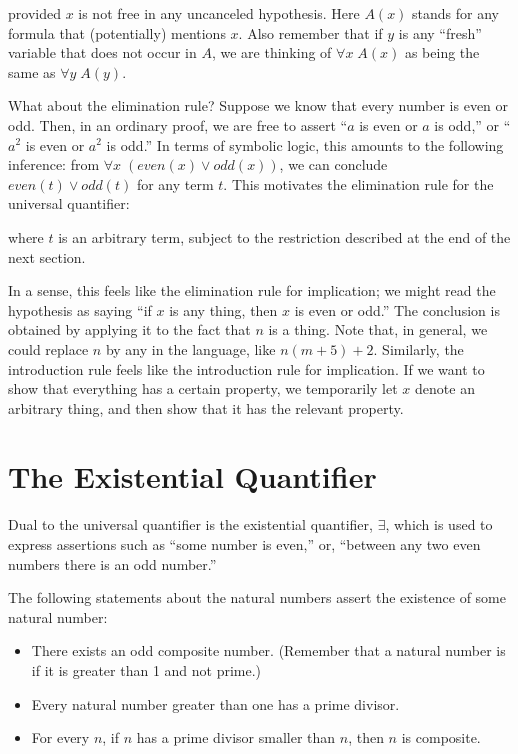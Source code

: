 \documentclass[letterpaper,10pt,english]{sphinxmanual}
\begin{document}
\sphinxAtStartPar
provided \(x\) is not free in any uncanceled hypothesis. Here \(A(x)\) stands for any formula that (potentially) mentions \(x\). Also remember that if \(y\) is any “fresh” variable that does not occur in \(A\), we are thinking of \(\forall x \; A(x)\) as being the same as \(\forall y \; A(y)\).

\sphinxAtStartPar
What about the elimination rule? Suppose we know that every number is even or odd. Then, in an ordinary proof, we are free to assert “\(a\) is even or \(a\) is odd,” or “\(a^2\) is even or \(a^2\) is odd.” In terms of symbolic logic, this amounts to the following inference: from \(\forall x \; (\mathit{even}(x) \vee \mathit{odd}(x))\), we can conclude \(\mathit{even}(t) \vee \mathit{odd}(t)\) for any term \(t\). This motivates the elimination rule for the universal quantifier:



\begin{prooftree}
\end{prooftree}

\sphinxAtStartPar
where \(t\) is an arbitrary term, subject to the restriction described at the end of the next section.

\sphinxAtStartPar
In a sense, this feels like the elimination rule for implication; we might read the hypothesis as saying “if \(x\) is any thing, then \(x\) is even or odd.” The conclusion is obtained by applying it to the fact that \(n\) is a thing. Note that, in general, we could replace \(n\) by any  in the language, like \(n (m + 5) +2\). Similarly, the introduction rule feels like the introduction rule for implication. If we want to show that everything has a certain property, we temporarily let \(x\) denote an arbitrary thing, and then show that it has the relevant property.


\section{The Existential Quantifier}
\label{\detokenize{first_order_logic:the-existential-quantifier}}
\sphinxAtStartPar
Dual to the universal quantifier is the existential quantifier, \(\exists\), which is used to express assertions such as “some number is even,” or, “between any two even numbers there is an odd number.”

\sphinxAtStartPar
The following statements about the natural numbers assert the existence of some natural number:
\begin{itemize}
\item {} 
\sphinxAtStartPar
There exists an odd composite number. (Remember that a natural number is  if it is greater than 1 and not prime.)

\item {} 
\sphinxAtStartPar
Every natural number greater than one has a prime divisor.

\item {} 
\sphinxAtStartPar
For every \(n\), if \(n\) has a prime divisor smaller than \(n\), then \(n\) is composite.

\end{itemize}
\end{document}
